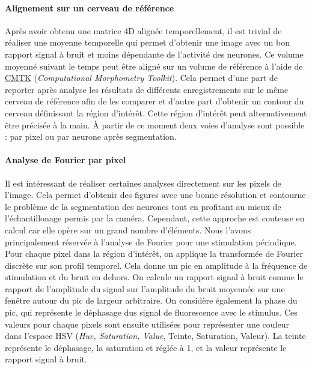 \paragraph{Alignement sur un cerveau de référence}

Après avoir obtenu une matrice 4D alignée temporellement, il est trivial de réaliser une moyenne temporelle qui permet d'obtenir une image avec un bon rapport signal à bruit et moins dépendante de l'activité des neurones. Ce volume moyenné suivant le temps peut être aligné sur un volume de référence à l'aide de \href{https://www.nitrc.org/projects/cmtk}{CMTK} (\emph{Computational Morphometry Toolkit}). Cela permet d'une part de reporter après analyse les résultats de différents enregistrements sur le même cerveau de référence afin de les comparer et d'autre part d'obtenir un contour du cerveau définissant la région d'intérêt. Cette région d'intérêt peut alternativement être précisée à la main. À partir de ce moment deux voies d'analyse sont possible : par pixel ou par neurone après segmentation.

\paragraph{Analyse de Fourier par pixel}

Il est intéressant de réaliser certaines analyses directement sur les pixels de l'image. Cela permet d'obtenir des figures avec une bonne résolution et contourne le problème de la segmentation des neurones tout en profitant au mieux de l'échantillonage permis par la caméra. Cependant, cette approche est couteuse en calcul car elle opère sur un grand nombre d'éléments. Nous l'avons principalement réservée à l'analyse de Fourier pour une stimulation périodique.
Pour chaque pixel dans la région d'intérêt, on applique la transformée de Fourier discrète sur son profil temporel. Cela donne un pic en amplitude à la fréquence de stimulation et du bruit en dehors. On calcule un rapport signal à bruit comme le rapport de l'amplitude du signal sur l'amplitude du bruit moyennée sur une fenêtre autour du pic de largeur arbitraire. On considère également la phase du pic, qui représente le déphasage dus signal de fluorescence avec le stimulus.
Ces valeurs pour chaque pixels sont ensuite utilisées pour représenter une couleur dans l'espace HSV (\emph{Hue, Saturation, Value}, Teinte, Saturation, Valeur). La teinte représente le déphasage, la saturation et réglée à 1, et la valeur représente le rapport signal à bruit. 

